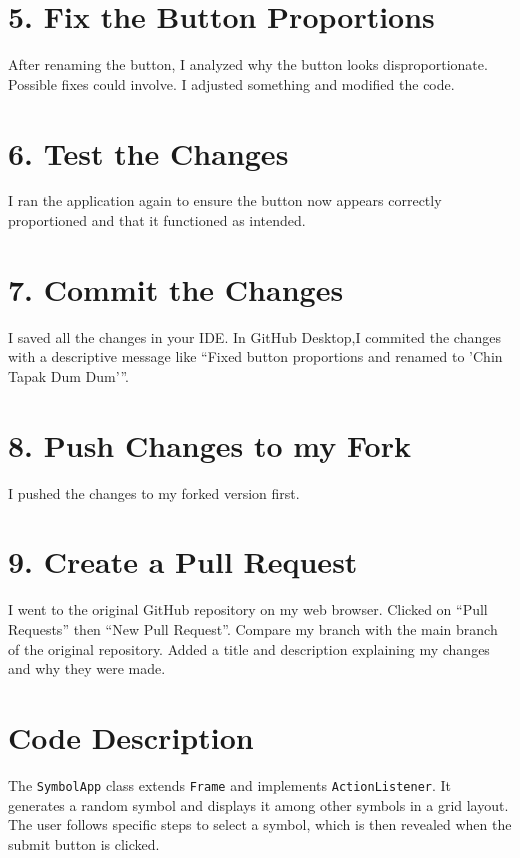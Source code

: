 \documentclass[12pt, a4paper]{article}
\begin{document}
\section*{ 5. Fix the Button Proportions}
After renaming the button, I analyzed why the button looks disproportionate. Possible fixes could involve. I adjusted something and modified the code.
\newpage
{}
\vspace{-2cm}
\section*{ 6. Test the Changes}
I ran the application again to ensure the button now appears correctly proportioned and that it functioned as intended.

\section*{ 7. Commit the Changes}
I saved all the changes in your IDE.
In GitHub Desktop,I commited the changes with a descriptive message like “Fixed button proportions and renamed to 'Chin Tapak Dum Dum'”.

\section*{ 8. Push Changes to my Fork}
I pushed the changes to my forked version first.

\section*{9. Create a Pull Request}
I went to the original GitHub repository on my web browser.
Clicked on “Pull Requests” then “New Pull Request”.
Compare my branch with the main branch of the original repository.
Added a title and description explaining my changes and why they were made.
\section*{Code Description}
The \texttt{SymbolApp} class extends \texttt{Frame} and implements \texttt{ActionListener}. It generates a random symbol and displays it among other symbols in a grid layout. The user follows specific steps to select a symbol, which is then revealed when the submit button is clicked.
\end{document}
